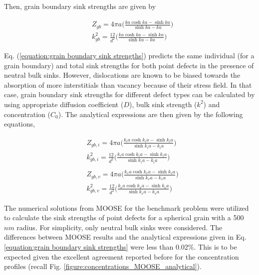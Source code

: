 \documentclass[utf8]{frontiersSCNS} %
\begin{document}
    Then, grain boundary sink strengths are given by
    
    \begin{equation}
      \begin{aligned}
        &Z_{gb}=4\pi a\bigg(\frac{ka\cosh ka-\sinh ka}{\sinh ka-ka}\bigg)\\
        &k^2_{gb}=\frac{12}{d^2}\bigg(\frac{ka\cosh ka-\sinh ka}{\sinh ka-ka}\bigg)
      \end{aligned}
      \label{equation:grain boundary sink strengths}
    \end{equation}

    Eq. (\ref{equation:grain boundary sink strengths}) predicts the same individual (for a grain boundary) and total sink strengths for both point defects in the presence of neutral bulk sinks. However, dislocations are known to be biased towards the absorption of more interstitials than vacancy because of their stress field.  In that case, grain boundary sink strengths for different defect types can be calculated by using appropriate diffusion coefficient ($D$), bulk sink strength ($k^2$) and concentration ($C_0$). The analytical expressions are then given by the following equations,

    \begin{equation}
      \begin{aligned}
        &Z_{gb,i}=4\pi a\bigg(\frac{k_ia\cosh k_ia-\sinh k_ia}{\sinh k_ia-k_ia}\bigg)\\
        &k^2_{gb,i}=\frac{12}{d^2}\bigg(\frac{k_ia\cosh k_ia-\sinh k_ia}{\sinh k_ia-k_ia}\bigg)\\\\
        &Z_{gb,v}=4\pi a\bigg(\frac{k_va\cosh k_va-\sinh k_va}{\sinh k_va-k_va}\bigg)\\
        &k^2_{gb,v}=\frac{12}{d^2}\bigg(\frac{k_va\cosh k_va-\sinh k_va}{\sinh k_va-k_va}\bigg)
      \end{aligned}
    \end{equation}
    
    The numerical solutions from MOOSE for the benchmark problem were utilized to calculate the sink strengths of point defects for a spherical grain with a 500 $nm$ radius. For simplicity, only neutral bulk sinks were considered. The differences between MOOSE results and the analytical expressions given in Eq. \ref{equation:grain boundary sink strengths} were less than 0.02\%. This is to be expected given the excellent agreement reported before for the concentration profiles (recall Fig. \ref{figure:concentrations_MOOSE_analytical}).   
    
\end{document}
